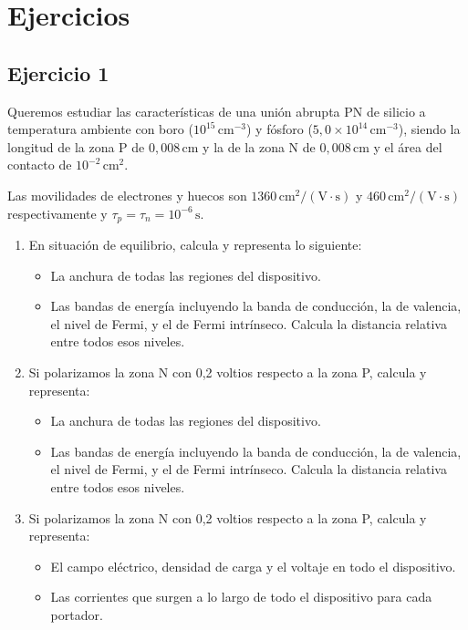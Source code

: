 \newpage

\section{Ejercicios}



\subsection{Ejercicio 1}


Queremos estudiar las características de una unión abrupta PN de silicio a temperatura ambiente con boro (\(10^{15} \, \text{cm}^{-3}\)) y fósforo (\(5,0 \times 10^{14} \, \text{cm}^{-3}\)), siendo la longitud de la zona P de \(0,008 \, \text{cm}\) y la de la zona N de \(0,008 \, \text{cm}\) y el área del contacto de \(10^{-2} \, \text{cm}^2\). 

Las movilidades de electrones y huecos son \(1360 \, \text{cm}^2/(\text{V}\cdot\text{s})\) y \(460 \, \text{cm}^2/(\text{V}\cdot\text{s})\) respectivamente y \(\tau_p = \tau_n = 10^{-6} \, \text{s}\).

\begin{enumerate}[label=\alph*)]
\item En situación de equilibrio, calcula y representa lo siguiente:
\begin{itemize}
    \item La anchura de todas las regiones del dispositivo.
    \item Las bandas de energía incluyendo la banda de conducción, la de valencia, el nivel de Fermi, y el de Fermi intrínseco. Calcula la distancia relativa entre todos esos niveles.
\end{itemize}

\item Si polarizamos la zona N con 0,2 voltios respecto a la zona P, calcula y representa:
\begin{itemize}
    \item La anchura de todas las regiones del dispositivo.
    \item Las bandas de energía incluyendo la banda de conducción, la de valencia, el nivel de Fermi, y el de Fermi intrínseco. Calcula la distancia relativa entre todos esos niveles.
\end{itemize}

\item Si polarizamos la zona N con 0,2 voltios respecto a la zona P, calcula y representa:
\begin{itemize}
    \item El campo eléctrico, densidad de carga y el voltaje en todo el dispositivo.
    \item Las corrientes que surgen a lo largo de todo el dispositivo para cada portador.
\end{itemize}
\end{enumerate}


